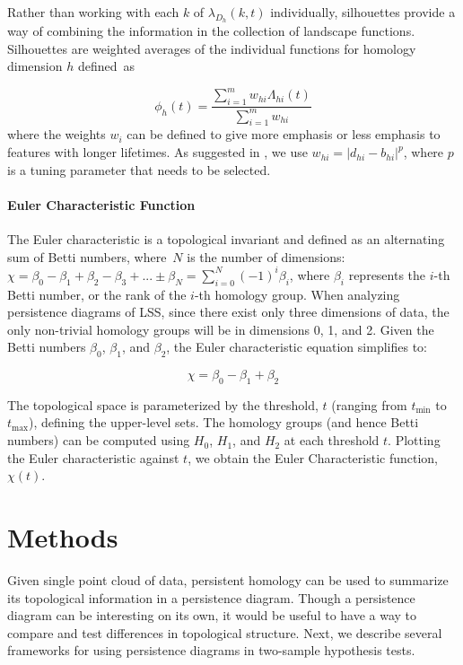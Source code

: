\documentclass[12pt]{article}
\begin{document}
Rather than working with each $k$ of $\lambda_{D_h}(k, t)$ individually, silhouettes provide a way of combining the information in the collection of landscape functions.  Silhouettes are weighted averages of the individual functions for homology dimension $h$ defined~as

\begin{equation*}
\phi_h(t) = \frac{\sum_{i = 1}^mw_{hi}\Lambda_{hi}(t)}{\sum_{i = 1}^mw_{hi}}
\end{equation*}
where the weights $w_i$ can be defined to give more emphasis or less emphasis to features with longer lifetimes.  As suggested in \cite{chazal2014stochastic}, we use $w_{hi} = |d_{hi} - b_{hi}|^p$, where $p$ is a tuning parameter that needs to be selected.

\paragraph{Euler Characteristic Function}
The Euler characteristic is a topological invariant and defined as an alternating sum of Betti numbers, where~$N$ is the number of dimensions: $\chi = \beta_{0} - \beta_{1} + \beta_{2} - \beta_{3} + ... \pm \beta_N = \sum_{i=0}^{N} (-1)^{i} \beta_{i}$,
where $\beta_{i}$ represents the $i$-th Betti number, or the rank of the $i$-th homology group. When analyzing persistence diagrams of LSS, since there exist only three dimensions of data, the only non-trivial homology groups will be in dimensions 0, 1, and 2. Given the Betti numbers $\beta_{0}$, $\beta_{1}$, and $\beta_{2}$, the Euler characteristic equation simplifies to:

\[ \chi = \beta_{0} - \beta_{1} + \beta_{2} \]

The topological space is parameterized by the threshold, $t$ (ranging from $t_{\min}$ to $t_{\max}$), defining the upper-level sets. The homology groups (and hence Betti numbers) can be computed using $H_{0}$, $H_{1}$, and $H_{2}$ at each threshold $t$. Plotting the Euler characteristic against $t$, we obtain the Euler Characteristic function, $\chi(t)$. 


\section{Methods}
\label{sec:methods}
Given single point cloud of data, persistent homology can be used to summarize its topological information in a persistence diagram.  Though a persistence diagram can be interesting on its own, it would be useful to have a way to compare and test differences in topological structure.  Next, we describe several frameworks for using persistence diagrams in two-sample hypothesis tests.  
\end{document}
